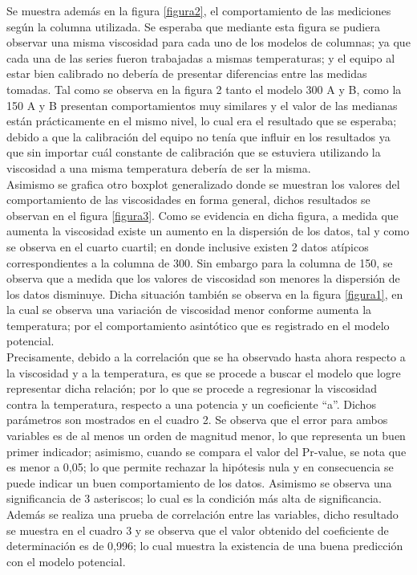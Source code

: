 \documentclass[12pt, letterpaper]{article}
\begin{document}
Se muestra además en la figura \ref{figura2}, el comportamiento de las mediciones según la columna utilizada. Se esperaba que mediante esta figura se pudiera observar una misma viscosidad para cada uno de los modelos de columnas; ya que cada una de las series fueron trabajadas a mismas temperaturas; y el equipo al estar bien calibrado no debería de presentar diferencias entre las medidas tomadas. Tal como se observa en la figura 2 tanto el modelo 300 A y B, como la 150 A y B presentan comportamientos muy similares y el valor de las medianas están prácticamente en el mismo nivel, lo cual era el resultado que se esperaba; debido a que la calibración del equipo no tenía que  influir en los resultados ya que sin importar cuál constante de calibración que se estuviera utilizando la viscosidad a una misma temperatura debería de ser la misma.\\ 
Asimismo se grafica otro boxplot generalizado donde se muestran los valores del comportamiento de las viscosidades en forma general, dichos resultados se observan en el figura \ref{figura3}. Como se evidencia en dicha figura, a medida que aumenta la viscosidad existe un aumento en la dispersión de los datos, tal y como se observa en el cuarto cuartil; en donde inclusive existen 2 datos atípicos correspondientes a la columna de 300. Sin embargo para la columna de 150, se observa que a medida que los valores de viscosidad son menores la dispersión de los datos disminuye. Dicha situación también se observa en la figura \ref{figura1}, en la cual se observa una variación de viscosidad menor conforme aumenta la temperatura; por el comportamiento asintótico que es registrado en el modelo potencial.\\ 
Precisamente, debido a la correlación que se ha observado hasta ahora respecto a la viscosidad y a la temperatura, es que se procede a buscar el modelo que logre representar dicha relación; por lo que se procede a regresionar la viscosidad contra la temperatura, respecto a una potencia y un coeficiente “a”. Dichos parámetros son mostrados en el cuadro 2. Se observa que el error para ambos variables es de al menos un orden de magnitud menor, lo que representa un buen primer indicador; asimismo, cuando se compara el valor del Pr-value, se nota que es menor a 0,05; lo que permite rechazar la hipótesis nula y en consecuencia se puede indicar un buen comportamiento de los datos. Asimismo se observa una significancia de 3 asteriscos; lo cual es la condición más alta de significancia. Además se realiza una prueba de correlación entre las variables, dicho resultado se muestra en el cuadro 3 y se observa que el valor obtenido del coeficiente de determinación es de 0,996; lo cual muestra la existencia de una buena predicción con el modelo potencial.\\ 
\end{document}
